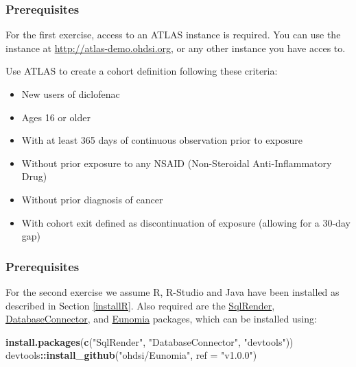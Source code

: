\documentclass[11pt]{book}
\newenvironment{Shaded}{\begin{snugshade}}{\end{snugshade}}
\newcommand{\KeywordTok}[1]{\textcolor[rgb]{0.13,0.29,0.53}{\textbf{#1}}}
\newcommand{\DataTypeTok}[1]{\textcolor[rgb]{0.13,0.29,0.53}{#1}}
\newcommand{\StringTok}[1]{\textcolor[rgb]{0.31,0.60,0.02}{#1}}
\newcommand{\OperatorTok}[1]{\textcolor[rgb]{0.81,0.36,0.00}{\textbf{#1}}}
\newcommand{\NormalTok}[1]{#1}
\providecommand{\tightlist}{%
  \setlength{\itemsep}{0pt}\setlength{\parskip}{0pt}}
\theoremstyle{definition}
\theoremstyle{definition}
\theoremstyle{definition}
\theoremstyle{remark}
\let\BeginKnitrBlock\begin \let\EndKnitrBlock\end
\begin{document}
\subsubsection*{Prerequisites}\label{prerequisites-2}

For the first exercise, access to an ATLAS instance is required. You can
use the instance at \url{http://atlas-demo.ohdsi.org}, or any other
instance you have acces to.

\BeginKnitrBlock{exercise}
\protect\hypertarget{exr:exerciseCohortsAtlas}{}{\label{exr:exerciseCohortsAtlas}
}Use ATLAS to create a cohort definition following these criteria:

\begin{itemize}
\tightlist
\item
  New users of diclofenac
\item
  Ages 16 or older
\item
  With at least 365 days of continuous observation prior to exposure
\item
  Without prior exposure to any NSAID (Non-Steroidal Anti-Inflammatory
  Drug)
\item
  Without prior diagnosis of cancer
\item
  With cohort exit defined as discontinuation of exposure (allowing for
  a 30-day gap)
\end{itemize}
\EndKnitrBlock{exercise}

\subsubsection*{Prerequisites}\label{prerequisites-3}

For the second exercise we assume R, R-Studio and Java have been
installed as described in Section \ref{installR}. Also required are the
\href{https://ohdsi.github.io/SqlRender/}{SqlRender},
\href{https://ohdsi.github.io/DatabaseConnector/}{DatabaseConnector},
and \href{https://ohdsi.github.io/Eunomia/}{Eunomia} packages, which can
be installed using:

\begin{Shaded}
\begin{Highlighting}[]
\KeywordTok{install.packages}\NormalTok{(}\KeywordTok{c}\NormalTok{(}\StringTok{"SqlRender"}\NormalTok{, }\StringTok{"DatabaseConnector"}\NormalTok{, }\StringTok{"devtools"}\NormalTok{))}
\NormalTok{devtools}\OperatorTok{::}\KeywordTok{install_github}\NormalTok{(}\StringTok{"ohdsi/Eunomia"}\NormalTok{, }\DataTypeTok{ref =} \StringTok{"v1.0.0"}\NormalTok{)}
\end{Highlighting}
\end{Shaded}
\end{document}
